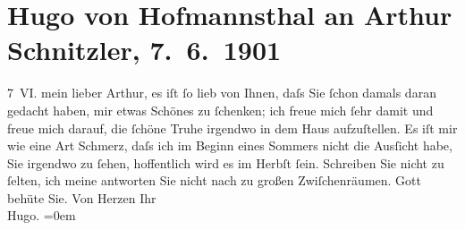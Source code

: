 

         \renewcommand{\erwaehnteOrte}{Orte: Wien}
         \renewcommand{\erwaehnteWerke}{}
               \section[Hugo von Hofmannsthal an Arthur Schnitzler, 7. 6. 1901]{ Hugo von Hofmannsthal an Arthur Schnitzler, 7. 6. 1901}\nopagebreak{}\rehead{ }\begin{ledgroupsized}[t]{13cm}\normalsize\beginnumbering \toendnotes[C]{\smallbreak\pagebreak[2]} 
\pstart
           \raggedleft{}{\pb}7 VI.\pend
           \pstart{}mein lieber Arthur, \pend\pstart
           es iſt ſo lieb von Ihnen, daſs Sie ſchon damals daran gedacht haben, mir etwas
               Schönes zu ſchenken; ich freue mich ſehr damit und freue mich darauf, die ſchöne
               Truhe irgendwo in dem Haus aufzuſtellen.\pend
           \pstart
           {\pb}Es iſt mir wie eine Art Schmerz,
               daſs ich im Beginn eines Sommers nicht die Ausſicht habe, Sie irgendwo
               zu ſehen, hoffentlich wird es im Herbſt{ }ſein. Schreiben Sie nicht zu ſelten, ich meine
               antworten Sie nicht nach zu großen Zwiſchenräumen.\pend
           \pstart
           {\pb}Gott behüte Sie.\pend
           \pstart
           Von Herzen Ihr{\\[\baselineskip]}\spacefill\mbox{Hugo.}\pend
           \leftskip=0em{}
         
         \endnumbering{}\end{ledgroupsized}  \newcommand{\dateiname}{L01126}\newcommand{\titel}{Hugo von Hofmannsthal an Arthur Schnitzler, 7. 6. 1901}\newcommand{\editorInnen}{Martin Anton Müller und Gerd-Hermann Susen}
      